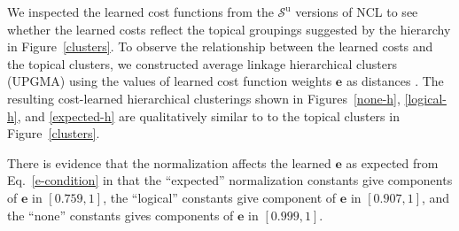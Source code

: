 \documentclass{article} %
\newcommand{\unorderedS}{\mathcal{S}^{\mathrm{u}}}
\newcommand{\ourmethod}{NCL}
\newcommand{\forpubnote}[1]{}
\begin{document}
We inspected the learned cost functions from 
the $\unorderedS$ versions of \ourmethod{} 
to see whether the learned costs reflect the 
topical groupings suggested by the hierarchy in
Figure~\ref{clusters}.  To observe the relationship between 
the learned costs and the
topical clusters, we constructed average linkage hierarchical 
clusters (UPGMA)
using the values of learned cost function weights $\mathbf{e}$ 
as distances \citep{legendrenumerical}.  
The resulting cost-learned hierarchical clusterings shown 
in Figures~\ref{none-h}, \ref{logical-h}, 
and \ref{expected-h} are qualitatively similar to
to the topical clusters in Figure~\ref{clusters}.
\forpubnote{It's difficult to make a precise comparison between
the cost learned hierarchies and the topical clusters due
to the fact that hierarchical clustering only outputs 
binary hierarchies, but the topical clusters do not form a
 binary hierarchy.  It would be more appropriate to use
 a method that outputs non-binary clusterings given a 
 distance metric, but we did not have time to explore such
 alternatives.
 Nevertheless, the hierarchies that
 we generated from learned costs still seem qualitatively
 compelling.}  

 There is evidence that the normalization 
 affects the learned $\mathbf{e}$ as expected from 
 Eq.~\ref{e-condition} in that the ``expected'' normalization
 constants give components of $\mathbf{e}$ in $[0.759,1]$, the
 ``logical'' constants give component of $\mathbf{e}$ in
 $[0.907, 1]$, and the ``none'' constants gives components of
 $\mathbf{e}$ in $[0.999,1]$.
\end{document}
